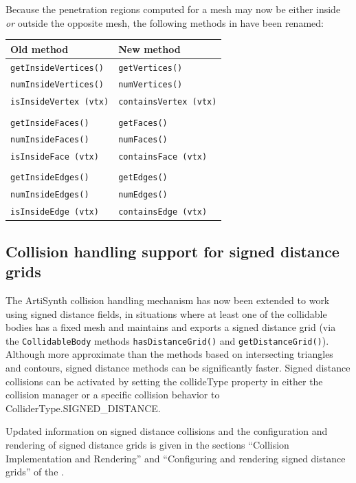 \documentclass{article}
\begin{document}
Because the penetration regions computed for a mesh may now be either
inside {\it or} outside the opposite mesh, the following methods in
 have been renamed:

\begin{tabular}{ll}
\hline
Old method & New method \\
\hline
{\tt getInsideVertices()} & {\tt getVertices()}\\
{\tt numInsideVertices()} & {\tt numVertices()}\\
{\tt isInsideVertex (vtx)} & {\tt containsVertex (vtx)}\\
&\\
{\tt getInsideFaces()} & {\tt getFaces()}\\
{\tt numInsideFaces()} & {\tt numFaces()}\\
{\tt isInsideFace (vtx)} & {\tt containsFace (vtx)}\\
&\\
{\tt getInsideEdges()} & {\tt getEdges()}\\
{\tt numInsideEdges()} & {\tt numEdges()}\\
{\tt isInsideEdge (vtx)} & {\tt containsEdge (vtx)}\\
\hline
\end{tabular}

\subsection*{Collision handling support for signed distance grids}

The ArtiSynth collision handling mechanism has now been extended to
work using signed distance fields, in situations where at least one of
the collidable bodies has a fixed mesh and maintains and exports a
signed distance grid (via the {\tt CollidableBody} methods
{\tt hasDistanceGrid()} and
{\tt getDistanceGrid()}).
Although more approximate than the methods based on intersecting
triangles and contours, signed distance methods can be significantly
faster. Signed distance collisions can be activated by setting the
{\sf collideType} property in either the collision manager or a
specific collision behavior to %
{ColliderType.SIGNED\_DISTANCE}.

Updated information on signed distance collisions and the
configuration and rendering of signed distance grids is given in the
sections ``Collision Implementation and Rendering'' and ``Configuring
and rendering signed distance grids'' of the
.
\end{document}
